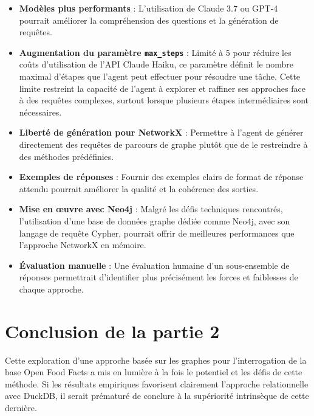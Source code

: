 \documentclass[a4paper,11pt]{article}
\begin{document}
\begin{itemize}
    \item \textbf{Modèles plus performants} : L'utilisation de Claude 3.7 ou GPT-4 pourrait améliorer la compréhension des questions et la génération de requêtes.
    
    \item \textbf{Augmentation du paramètre \texttt{max\_steps}} : Limité à 5 pour réduire les coûts d'utilisation de l'API Claude Haiku, ce paramètre définit le nombre maximal d'étapes que l'agent peut effectuer pour résoudre une tâche. Cette limite restreint la capacité de l'agent à explorer et raffiner ses approches face à des requêtes complexes, surtout lorsque plusieurs étapes intermédiaires sont nécessaires.
    
    
    \item \textbf{Liberté de génération pour NetworkX} : Permettre à l'agent de générer directement des requêtes de parcours de graphe plutôt que de le restreindre à des méthodes prédéfinies.
    
    \item \textbf{Exemples de réponses} : Fournir des exemples clairs de format de réponse attendu pourrait améliorer la qualité et la cohérence des sorties.
    
    \item \textbf{Mise en œuvre avec Neo4j} : Malgré les défis techniques rencontrés, l'utilisation d'une base de données graphe dédiée comme Neo4j, avec son langage de requête Cypher, pourrait offrir de meilleures performances que l'approche NetworkX en mémoire.
    
    \item \textbf{Évaluation manuelle} : Une évaluation humaine d'un sous-ensemble de réponses permettrait d'identifier plus précisément les forces et faiblesses de chaque approche.
\end{itemize}

\section{Conclusion de la partie 2}
\label{sec:conclusion-partie2}


Cette exploration d'une approche basée sur les graphes pour l'interrogation de la base Open Food Facts a mis en lumière à la fois le potentiel et les défis de cette méthode. Si les résultats empiriques favorisent clairement l'approche relationnelle avec DuckDB, il serait prématuré de conclure à la supériorité intrinsèque de cette dernière.
\end{document}
